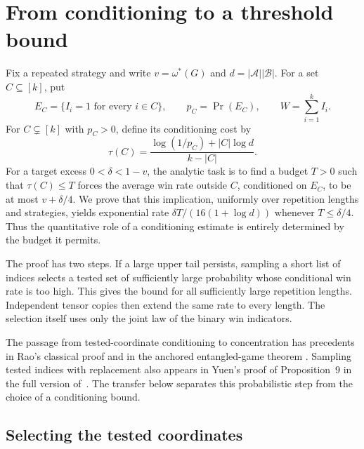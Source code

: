 \section{From conditioning to a threshold bound}
\label{sec:threshold}

Fix a repeated strategy and write $v=\omega^*(G)$ and
$d=|\mathcal A||\mathcal B|$. For a set $C\subseteq[k]$, put
\[
 E_C=\{I_i=1\text{ for every }i\in C\},
 \qquad p_C=\Pr(E_C),\qquad W=\sum_{i=1}^k I_i.
\]
For $C\subsetneq[k]$ with $p_C>0$, define its conditioning cost by
\[
 \tau(C)=\frac{\log(1/p_C)+|C|\log d}{k-|C|}.
\]
For a target excess $0<\delta<1-v$, the analytic task is to find a budget
$T>0$ such that $\tau(C)\le T$ forces the average win rate outside $C$,
conditioned on $E_C$, to be at most $v+\delta/4$.
We prove that this implication, uniformly over repetition lengths and
strategies, yields exponential rate $\delta T/(16(1+\log d))$ whenever
$T\le\delta/4$. Thus the quantitative role of a conditioning estimate
is entirely determined by the budget it permits.

The proof has two steps. If a large upper tail persists, sampling a short
list of indices selects a tested set of sufficiently large probability
whose conditional win rate is too high. This gives the bound for all
sufficiently large repetition lengths. Independent tensor copies then
extend the same rate to every length. The selection itself uses only the
joint law of the binary win indicators.

The passage from tested-coordinate conditioning to concentration has
precedents in Rao's classical proof \cite[Section~8]{rao2011} and in the
anchored entangled-game theorem \cite[Section~5.4]{bvy2017}. Sampling
tested indices with replacement also appears in Yuen's proof of
Proposition~9 in the full version of~\cite{yuen2016}. The transfer below
separates this probabilistic step from the choice of a conditioning bound.



\subsection{Selecting the tested coordinates}

